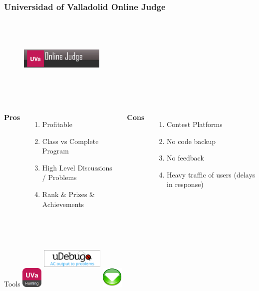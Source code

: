 \documentclass{beamer}
\begin{document}
\begin{frame}
	\frametitle{Universidad of Valladolid Online Judge}
	\begin{figure}[t]
		\href{https://uva.onlinejudge.org/}{\includegraphics[width=4cm,height=4cm,keepaspectratio]{images/judges/uva}}
	\end{figure}
	
	\begin{columns}[c] %
		\textbf{Pros}
		\begin{enumerate}
			\item Profitable 
			\item Class vs Complete Program 
			\item High Level Discussions / Problems
			\item Rank \& Prizes \& Achievements
		\end{enumerate}
		\textbf{Cons}
		\begin{enumerate}
			\item Contest Platforms
			\item No code backup
			\item No feedback
			\item Heavy traffic of users (delays in response)
		\end{enumerate}
	\end{columns}
	\begin{block}{Tools}
	\center
	\href{http://uhunt.felix-halim.net/} {\includegraphics[width=1cm,height=1cm,keepaspectratio]{images/tools/uvahunting}}
	\href{https://www.udebug.com/}	{\includegraphics[width=3cm,height=3cm,keepaspectratio]{images/tools/udebug}}
	\href{http://uvatoolkit.com/problemssolve.php}{\includegraphics[width=1cm,height=1cm,keepaspectratio]{images/tools/uvatoolkit}}
	\end{block}

\end{frame}
\end{document}
